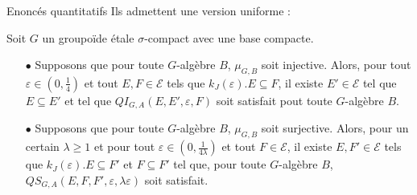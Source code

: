\begin{frame}{Enoncés quantitatifs}
Ils admettent une version uniforme :
\begin{thmfr} Soit $G$ un groupoïde étale $\sigma$-compact avec une base compacte. \\
\begin{itemize}
\item[$\bullet$] Supposons que pour toute $G$-algèbre $B$, $\mu_{G,B}$ soit injective. Alors, pour tout $\varepsilon\in (0,\frac{1}{4})$ et tout $E,F\in\mathcal E$ tels que $k_J(\varepsilon). E\subseteq F$, il existe $E'\in\mathcal E$ tel que $E\subseteq E'$ et tel que $QI_{G,A}(E,E',\varepsilon,F)$ soit satisfait pout toute $G$-algèbre $B$.\\
\item[$\bullet$] Supposons que pour toute $G$-algèbre $B$, $\mu_{G,B}$ soit surjective. Alors, pour un certain $\lambda \geq 1$ et pour tout $\varepsilon\in (0,\frac{1}{4\lambda})$ et tout $F\in\mathcal E$, il existe $E,F'\in\mathcal E$ tels que $k_J(\varepsilon). E\subseteq F'$ et $F\subseteq F'$ tel que, pour toute $G$-algèbre $B$, $QS_{G,A}(E, F,F',\varepsilon,\lambda \varepsilon)$ soit satisfait.
\end{itemize}
\end{thmfr}
\end{frame}


